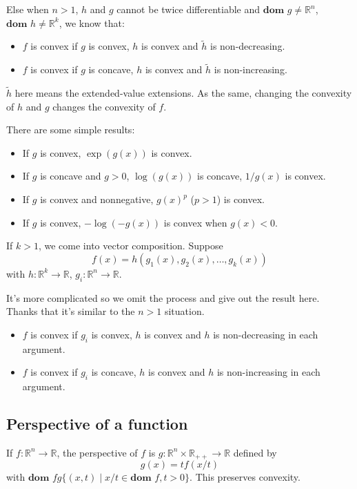 \documentclass[lang=en,color=blue,mode=fancy,titlestyle=hang]{elegantbook}
\begin{document}
Else when $n > 1$, $h$ and $g$ cannot be twice differentiable and
$\textbf{dom } g \neq \mathbb{R}^n$, $\textbf{dom } h \neq \mathbb{R}^k$, we know that:
\begin{itemize}
  \item $f$ is convex if $g$ is convex, $h$ is convex and $\tilde{h}$ is non-decreasing.
  \item $f$ is convex if $g$ is concave, $h$ is convex and $\tilde{h}$ is non-increasing.
\end{itemize}
$\tilde{h}$ here means the extended-value extensions. As the same, changing the convexity of
$h$ and $g$ changes the convexity of $f$.

There are some simple results:
\begin{itemize}
  \item If $g$ is convex, $\exp(g(x))$ is convex.
  \item If $g$ is concave and $g > 0$, $\log(g(x))$ is concave, $1/g(x)$ is convex.
  \item If $g$ is convex and nonnegative, $g(x)^p$ ($p > 1$) is convex.
  \item If $g$ is convex, $-\log(-g(x))$ is convex when $g(x) < 0$.
\end{itemize}

If $k > 1$, we come into vector composition. Suppose
\[
f(x) = h(g_1(x), g_2(x), \ldots, g_k(x))
\]
with $h: \mathbb{R}^k \rightarrow \mathbb{R}$, $g_i: \mathbb{R}^n \rightarrow \mathbb{R}$.

It's more complicated so we omit the process and give out the result here. Thanks that
it's similar to the $n > 1$ situation.

\begin{itemize}
  \item $f$ is convex if $g_i$ is convex, $h$ is convex and $h$ is non-decreasing
  in each argument.
  \item $f$ is convex if $g_i$ is concave, $h$ is convex and $h$ is non-increasing
  in each argument.
\end{itemize}

\subsection{Perspective of a function}
If $f: \mathbb{R}^n \rightarrow \mathbb{R}$, the perspective of $f$ is
$g: \mathbb{R}^n \times \mathbb{R}_{++} \rightarrow \mathbb{R}$ defined by
\[
g(x) = tf(x/t)
\]
with $\textbf{dom } f g\{ (x, t) \;|\; x/t \in \textbf{dom } f, t > 0 \}$. This preserves
convexity.
\end{document}
